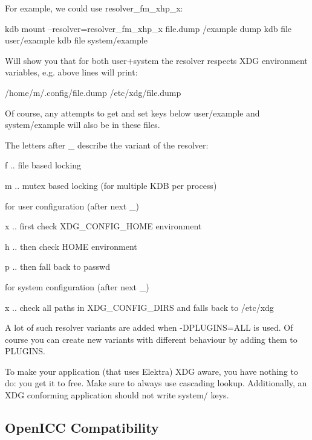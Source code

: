 For example, we could use resolver\+\_\+fm\+\_\+xhp\+\_\+x\+: \begin{DoxyVerb}kdb mount --resolver=resolver_fm_xhp_x file.dump /example dump
kdb file user/example
kdb file system/example
\end{DoxyVerb}


Will show you that for both user+system the resolver respects X\+D\+G environment variables, e.\+g. above lines will print\+: \begin{DoxyVerb}/home/m/.config/file.dump
/etc/xdg/file.dump
\end{DoxyVerb}


Of course, any attempts to get and set keys below user/example and system/example will also be in these files.

The letters after \+\_\+ describe the variant of the resolver\+:


\begin{DoxyItemize}
\item f .. file based locking
\item m .. mutex based locking (for multiple K\+D\+B per process)
\item for user configuration (after next \+\_\+)
\begin{DoxyItemize}
\item x .. first check X\+D\+G\+\_\+\+C\+O\+N\+F\+I\+G\+\_\+\+H\+O\+M\+E environment
\item h .. then check H\+O\+M\+E environment
\item p .. then fall back to passwd
\end{DoxyItemize}
\item for system configuration (after next \+\_\+)
\begin{DoxyItemize}
\item x .. check all paths in X\+D\+G\+\_\+\+C\+O\+N\+F\+I\+G\+\_\+\+D\+I\+R\+S and falls back to /etc/xdg
\end{DoxyItemize}
\end{DoxyItemize}

A lot of such resolver variants are added when -\/\+D\+P\+L\+U\+G\+I\+N\+S=A\+L\+L is used. Of course you can create new variants with different behaviour by adding them to P\+L\+U\+G\+I\+N\+S.

To make your application (that uses Elektra) X\+D\+G aware, you have nothing to do\+: you get it to free. Make sure to always use cascading lookup. Additionally, an X\+D\+G conforming application should not write system/ keys.

\subsection*{Open\+I\+C\+C Compatibility}

